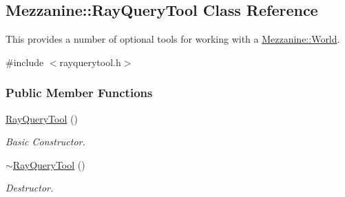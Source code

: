 \hypertarget{classMezzanine_1_1RayQueryTool}{
\subsection{Mezzanine::RayQueryTool Class Reference}
\label{classMezzanine_1_1RayQueryTool}
}


This provides a number of optional tools for working with a \hyperlink{classMezzanine_1_1World}{Mezzanine::World}.  




{\ttfamily \#include $<$rayquerytool.h$>$}

\subsubsection*{Public Member Functions}
\begin{DoxyCompactItemize}
\item 
\hyperlink{classMezzanine_1_1RayQueryTool_a53bc1773227eee1543e3a61f96395756}{RayQueryTool} ()
\begin{DoxyCompactList}\small\item\em Basic Constructor. \item\end{DoxyCompactList}\item 
\hyperlink{classMezzanine_1_1RayQueryTool_a086d26c2ccb830dca62bffb50f0bd470}{$\sim$RayQueryTool} ()
\begin{DoxyCompactList}\small\item\em Destructor. \item\end{DoxyCompactList}\end{DoxyCompactItemize}
